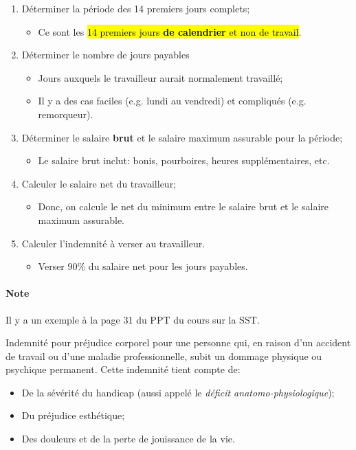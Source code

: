\documentclass[10pt, french]{article}
\begin{document}
\begin{multicols*}{3}
\begin{algo2}
\begin{enumerate}[leftmargin = *]
	\item	Déterminer la période des 14 premiers jours complets;
		\begin{itemize}[leftmargin = *]
		\item	Ce sont les \hl{14 premiers jours \textbf{de calendrier} et non de travail}.
		\end{itemize}
	\item	Déterminer le nombre de jours payables
		\begin{itemize}[leftmargin = *]
		\item	Jours auxquels le travailleur aurait normalement travaillé;
		\item	Il y a des cas faciles (e.g. lundi au vendredi) et compliqués (e.g. remorqueur).
		\end{itemize}
	\item	Déterminer le salaire \textbf{brut} et le salaire maximum assurable pour la période;
		\begin{itemize}[leftmargin = *]
		\item	Le salaire brut inclut: bonis, pourboires, heures supplémentaires, etc.
		\end{itemize}
	\item	Calculer le salaire net du travailleur;
		\begin{itemize}[leftmargin = *]
		\item	Donc, on calcule le net du minimum entre le salaire brut et le salaire maximum assurable.
		\end{itemize}
	\item	Calculer l’indemnité à verser au travailleur.
		\begin{itemize}[leftmargin = *]
		\item	Verser 90\% du salaire net pour les jours payables.
		\end{itemize}
\end{enumerate}

\paragraph{Note}	Il y a un exemple à la page 31 du PPT du cours sur la SST.
\end{algo2}

\begin{definitionNOHFILL}
Indemnité pour préjudice corporel pour une personne qui, en raison d'un accident de travail ou d'une maladie professionnelle, subit un dommage physique ou psychique permanent. Cette indemnité tient compte de:
\begin{itemize}[leftmargin = *]
	\item	De la sévérité du handicap (aussi appelé le \textit{déficit anatomo-physiologique});
	\item	Du préjudice esthétique;
	\item	Des douleurs et de la perte de jouissance de la vie.
\end{itemize}


\end{definitionNOHFILL}
\end{multicols*}
\end{document}
